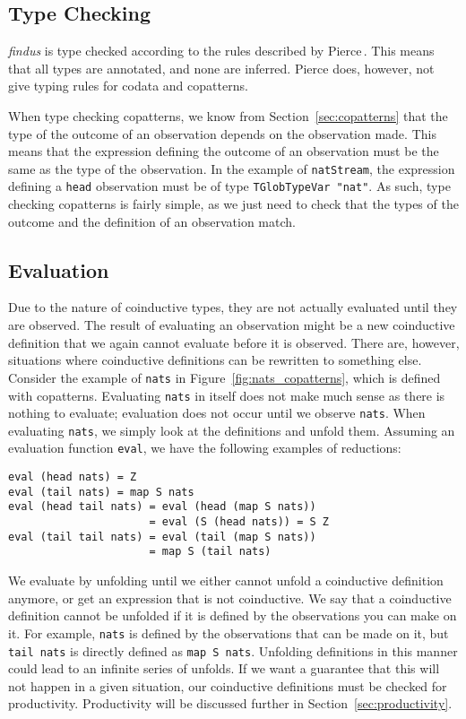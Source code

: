\subsection{Type Checking}
\textit{findus} is type checked according to the rules described by Pierce\,\cite{Pierce:2002:TPL:509043}. This means that all types are annotated, and none are inferred. Pierce does, however, not give typing rules for codata and copatterns.

When type checking copatterns, we know from Section~\ref{sec:copatterns} that the type of the outcome of an observation depends on the observation made. This means that the expression defining the outcome of an observation must be the same as the type of the observation. In the example of \texttt{natStream}, the expression defining a \texttt{head} observation must be of type \texttt{TGlobTypeVar "nat"}. As such, type checking copatterns is fairly simple, as we just need to check that the types of the outcome and the definition of an observation match.

\subsection{Evaluation}
Due to the nature of coinductive types, they are not actually evaluated until they are observed. The result of evaluating an observation might be a new coinductive definition that we again cannot evaluate before it is observed. There are, however, situations where coinductive definitions can be rewritten to something else. Consider the example of \texttt{nats} in Figure~\ref{fig:nats_copatterns}, which is defined with copatterns. Evaluating \texttt{nats} in itself does not make much sense as there is nothing to evaluate; evaluation does not occur until we observe \texttt{nats}. When evaluating \texttt{nats}, we simply look at the definitions and unfold them. Assuming an evaluation function \texttt{eval}, we have the following examples of reductions:

\begin{Verbatim}[commandchars=\\\{\},codes={\catcode`$=3\catcode`_=8}]
eval (head nats) = Z
eval (tail nats) = map S nats
eval (head tail nats) = eval (head (map S nats)) 
                      = eval (S (head nats)) = S Z
eval (tail tail nats) = eval (tail (map S nats)) 
                      = map S (tail nats)
\end{Verbatim}

We evaluate by unfolding until we either cannot unfold a coinductive definition anymore, or get an expression that is not coinductive. We say that a coinductive definition cannot be unfolded if it is defined by the observations you can make on it. For example, \texttt{nats} is defined by the observations that can be made on it, but \texttt{tail nats} is directly defined as \texttt{map S nats}. Unfolding definitions in this manner could lead to an infinite series of unfolds. If we want a guarantee that this will not happen in a given situation, our coinductive definitions must be checked for productivity. Productivity will be discussed further in Section~\ref{sec:productivity}. 

